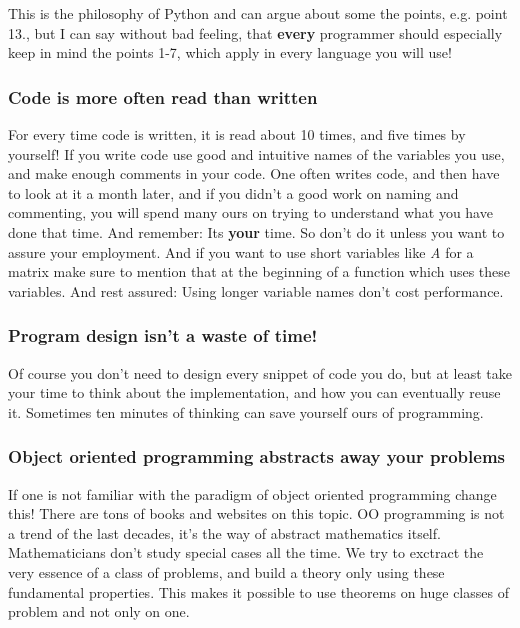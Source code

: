 \documentclass[letterpaper,10pt,english]{manual}
\begin{document}
This is the philosophy of Python and can argue about some the points,
e.g. point 13., but I can say without bad feeling, that \textbf{every}
programmer should especially keep in mind the points 1-7, which apply in every
language you will use!


\subsubsection{Code is more often read than written}

For every time code is written, it is read about 10 times, and
five times by yourself! If you write code use good and intuitive
names of the variables you use, and make enough comments in your code.
One often writes code, and then have to look at it a month later, and if
you didn't a good work on naming and commenting, you will spend many ours
on trying to understand what you have done that time. And remember: Its \textbf{your} time.
So don't do it unless you want to assure your employment.
And if you want to use short variables like \emph{A} for a matrix make sure to mention
that at the beginning of a function which uses these variables.
And rest assured: Using longer variable names don't cost performance.


\subsubsection{Program design isn't a waste of time!}

Of course you don't need to design every snippet of code you do,
but at least take your time to think about the implementation, and
how you can eventually reuse it. Sometimes ten minutes of thinking
can save yourself ours of programming.
\hypertarget{oo-ref}{}

\subsubsection{Object oriented programming abstracts away your problems}

If one is not familiar with the paradigm of object oriented programming change this!
There are tons of books and websites on this topic.
OO programming is not a trend of the last decades, it's the way of abstract mathematics itself.
Mathematicians don't study special cases all the time. We try to exctract the very essence of a class
of problems, and build a theory only using these fundamental properties. This makes it possible to
use theorems on huge classes of problem and not only on one.
\end{document}
